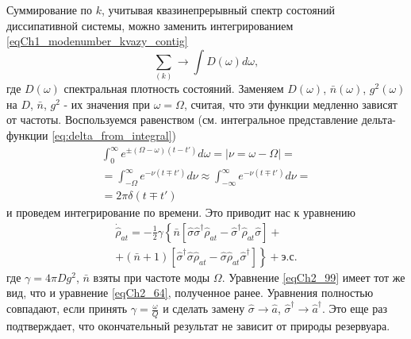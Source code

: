 Суммирование по $k$,  учитывая квазинепрерывный спектр состояний
диссипативной системы, можно заменить интегрированием
\eqref{eqCh1_modenumber_kvazy_contig} 
\[
\sum_{(k)} \rightarrow \int D\left(\omega\right)d \omega,
\]  
где $D\left(\omega\right)$ спектральная плотность состояний. Заменяем
$D\left(\omega\right)$, $\bar{n}\left(\omega\right)$,
$g^2\left(\omega\right)$ на $D$, $\bar{n}$, $g^2$ - их значения при
$\omega = \Omega$,  считая, что эти функции медленно   
зависят от частоты. Воспользуемся равенством (см.
интегральное представление дельта-функции
\eqref{eq:delta_from_integral})
\begin{eqnarray}
\int_{0}^\infty
e^{\pm\left(\Omega - \omega\right)
\left(t - t'\right)}d \omega = \left|\nu = \omega - \Omega\right| =
\nonumber \\
=
\int_{-\Omega}^\infty
e^{ - \nu
\left(t \mp t'\right)}d \nu \approx
\int_{-\infty}^\infty
e^{ - \nu
\left(t \mp t'\right)}d \nu = 
\nonumber \\
= 2 \pi \delta \left(t \mp t'\right) 
\label{eqCh2_98}
\end{eqnarray}
и проведем интегрирование по времени. Это приводит нас к уравнению 
\begin{eqnarray}
\dot{\hat{\rho}}_{at} = -\frac{1}{2}\gamma \left\{
\bar{n}\left[
\hat{\sigma}\hat{\sigma}^{\dag}\hat{\rho}_{at} -
\hat{\sigma}^{\dag}\hat{\rho}_{at}\hat{\sigma}
\right] +
\right.
\nonumber \\
+
\left.
\left(\bar{n} + 1\right)\left[
\hat{\sigma}^{\dag}\hat{\sigma}\hat{\rho}_{at} -
\hat{\sigma}\hat{\rho}_{at}\hat{\sigma}^{\dag}
\right]
\right\}
+ \mbox{э.с.}
\label{eqCh2_99}
\end{eqnarray}
где $\gamma =4 \pi D g^2$, $\bar{n}$ взяты при частоте моды $\Omega$.
Уравнение \eqref{eqCh2_99} имеет тот же вид, что и уравнение
\eqref{eqCh2_64}, полученное ранее. Уравнения 
полностью совпадают, если  принять $\gamma = \frac{\omega}{Q}$ и
сделать замену $\hat{\sigma} \rightarrow \hat{a}$, $\hat{\sigma}^{\dag}
\rightarrow \hat{a}^{\dag}$.  Это еще раз подтверждает, что окончательный
результат не зависит от природы резервуара.   

